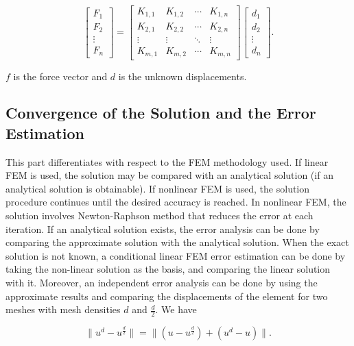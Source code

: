 \begin{equation}
\begin{bmatrix} F_{1} \\ F_{2} \\ \vdots \\ F_{n}
\end{bmatrix}
 =
 \begin{bmatrix}
  K_{1,1} & K_{1,2} & \cdots & K_{1,n} \\
  K_{2,1} & K_{2,2} & \cdots & K_{2,n} \\
  \vdots  & \vdots  & \ddots & \vdots  \\
  K_{m,1} & K_{m,2} & \cdots & K_{m,n}
 \end{bmatrix}
 \begin{bmatrix} d_{1} \\ d_{2} \\ \vdots \\ d_{n}
\end{bmatrix}.
\label{eqn:1.2}
\end{equation}

\noindent $f$ is the force vector and $d$ is the unknown displacements.

\subsection{Convergence of the Solution and the Error Estimation}
\label{sec:csee}

This part differentiates with respect to the FEM methodology used. If linear FEM is used, the solution may be compared with an analytical solution (if an analytical solution is obtainable). If nonlinear FEM is used, the solution procedure continues until the desired accuracy is reached. In nonlinear FEM, the solution involves Newton-Raphson method that reduces the error at each iteration. If an analytical solution exists, the error analysis can be done by comparing the approximate solution with the analytical solution. When the exact solution is not known, a conditional linear FEM error estimation can be done by taking the non-linear solution as the basis, and comparing the linear solution with it. Moreover, an independent error analysis can be done by using the approximate results and comparing the displacements of the element for two meshes with mesh densities $d$ and $\frac{d}{2}$. We have

\begin{equation}
\parallel u^d - u^{\frac{d}{2}}\parallel = \parallel (u - u^{\frac{d}{2}}) + (u^d - u) \parallel.
\label{eqn:1.3}
\end{equation}

